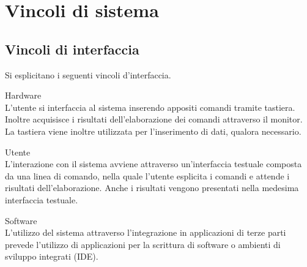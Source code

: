 
\section{Vincoli di sistema}
\vincoliinit
\subsection{Vincoli di interfaccia}

Si esplicitano i seguenti vincoli d'interfaccia.
\vincolistart
	\item Hardware\\	
	L'utente si interfaccia al sistema inserendo appositi comandi tramite tastiera. Inoltre acquisisce i risultati dell'elaborazione dei comandi attraverso il monitor. La tastiera viene inoltre utilizzata per l'inserimento di dati, qualora necessario.
	
	\item Utente\\
	L'interazione con il sistema avviene attraverso un'interfaccia testuale composta da una linea di comando, nella quale l'utente esplicita i comandi e attende i risultati dell'elaborazione. Anche i risultati vengono presentati nella medesima interfaccia testuale.
	
	\item Software\\
	L'utilizzo del sistema attraverso l'integrazione in applicazioni di terze parti prevede l'utilizzo di applicazioni per la scrittura di software o ambienti di sviluppo integrati (IDE).
	
